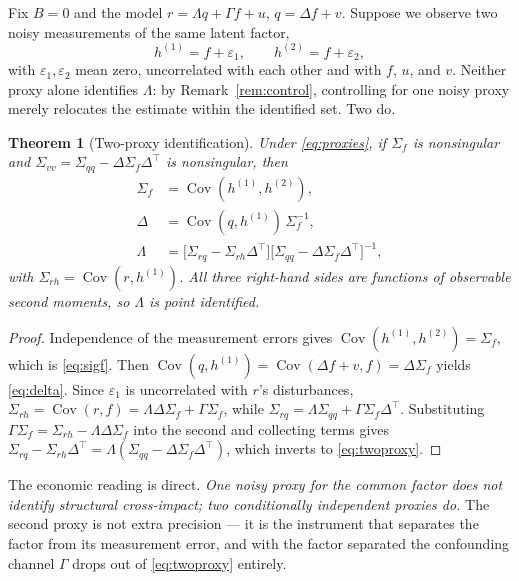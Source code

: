 \documentclass[10pt,twocolumn]{article}
\newtheorem{theorem}{Theorem}
\theoremstyle{remark}
\begin{document}
Fix $B=0$ and the model $r=\Lambda q+\Gamma f+u$, $q=\Delta f+v$. Suppose we
observe two noisy measurements of the same latent factor,
\begin{equation}
h^{(1)}=f+\varepsilon_1,\qquad h^{(2)}=f+\varepsilon_2,
\label{eq:proxies}
\end{equation}
with $\varepsilon_1,\varepsilon_2$ mean zero, uncorrelated with each other and
with $f$, $u$, and $v$. Neither proxy alone identifies $\Lambda$: by
Remark~\ref{rem:control}, controlling for one noisy proxy merely relocates the
estimate within the identified set. Two do.

\begin{theorem}[Two-proxy identification]
\label{thm:twoproxy}
Under \eqref{eq:proxies}, if $\Sigma_f$ is nonsingular and
$\Sigma_{vv}=\Sigma_{qq}-\Delta\Sigma_f\Delta^\top$ is nonsingular, then
\begin{align}
\Sigma_f&=\operatorname{Cov}(h^{(1)},h^{(2)}), \label{eq:sigf}\\
\Delta&=\operatorname{Cov}(q,h^{(1)})\,\Sigma_f^{-1}, \label{eq:delta}\\
\Lambda&=\bigl[\Sigma_{rq}-\Sigma_{rh}\Delta^\top\bigr]
\bigl[\Sigma_{qq}-\Delta\Sigma_f\Delta^\top\bigr]^{-1},
\label{eq:twoproxy}
\end{align}
with $\Sigma_{rh}=\operatorname{Cov}(r,h^{(1)})$. All three right-hand sides
are functions of observable second moments, so $\Lambda$ is point identified.
\end{theorem}

\begin{proof}
Independence of the measurement errors gives
$\operatorname{Cov}(h^{(1)},h^{(2)})=\Sigma_f$, which is \eqref{eq:sigf}. Then
$\operatorname{Cov}(q,h^{(1)})=\operatorname{Cov}(\Delta f+v,f)=\Delta\Sigma_f$
yields \eqref{eq:delta}. Since $\varepsilon_1$ is uncorrelated with $r$'s
disturbances, $\Sigma_{rh}=\operatorname{Cov}(r,f)=\Lambda\Delta\Sigma_f
+\Gamma\Sigma_f$, while
$\Sigma_{rq}=\Lambda\Sigma_{qq}+\Gamma\Sigma_f\Delta^\top$. Substituting
$\Gamma\Sigma_f=\Sigma_{rh}-\Lambda\Delta\Sigma_f$ into the second and
collecting terms gives
$\Sigma_{rq}-\Sigma_{rh}\Delta^\top=\Lambda(\Sigma_{qq}
-\Delta\Sigma_f\Delta^\top)$, which inverts to \eqref{eq:twoproxy}.
\end{proof}

The economic reading is direct. \emph{One noisy proxy for the common factor
does not identify structural cross-impact; two conditionally independent
proxies do.} The second proxy is not extra precision --- it is the instrument
that separates the factor from its measurement error, and with the factor
separated the confounding channel $\Gamma$ drops out of \eqref{eq:twoproxy}
entirely.
\end{document}
